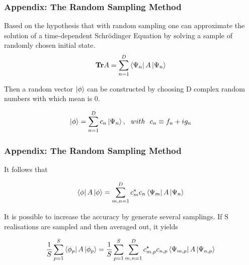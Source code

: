 \documentclass{beamer}
\begin{document}
\begin{frame}
	\frametitle{Appendix: The Random Sampling Method}
	Based on the hypothesis that with random sampling one can approximate the solution of a time-dependent Schrödinger Equation by solving a sample of randomly chosen initial state.
	\begin{equation*}
	\begin{split}
	\mathbf{Tr}A=\sum_{n=1}^{D} \bra{\Psi_n}A\ket{\Psi_n}\\
	\end{split}
	\end{equation*}
	
	Then a random vector $\ket{\phi}$ can be constructed by choosing D complex random numbers with which mean is 0.
	
	\begin{equation*}
	\begin{split}
	\ket{\phi}= \sum_{n=1}^{D} c_n \ket{{\Psi_n}}, ~~ with ~~c_n \equiv f_n + i g_n\\
	\end{split}
	\end{equation*}
\end{frame}


\begin{frame}
	\frametitle{Appendix: The Random Sampling Method}
	It follows that
	
	\begin{equation*}
	\begin{split}
	\bra{\phi}A\ket{\phi} = \sum_{m,n=1}^{D} c_m^\star c_n  \bra{\Psi_m}A\ket{\Psi_n}\\
	\end{split}
	\end{equation*}
	
	
	It is possible to increase the accuracy by generate several samplings. If S realisations are sampled and then averaged out, it yields 
	
	\begin{equation*}
	\begin{split}
	\label{random_sampling}
	\frac{1}{S}\sum_{p=1}^{S} \bra{\phi_p}A\ket{\phi_p} = \frac{1}{S} \sum_{p=1}^{S} \sum_{m,n=1}^{D} c_{m,p}^\star c_{n,p}  \bra{\Psi_{m,p}}A\ket{\Psi_{n,p}}
	\end{split}
	\end{equation*}
	
	
\end{frame}
\end{document}
